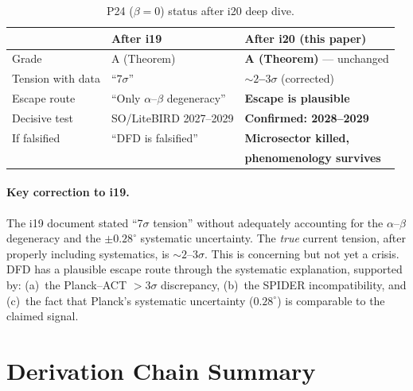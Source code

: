 \documentclass[11pt]{article}
\begin{document}
\begin{table}[h]
\centering
\caption{P24 ($\beta = 0$) status after i20 deep dive.}
\begin{tabular}{lll}
\toprule
& \textbf{After i19} & \textbf{After i20 (this paper)} \\
\midrule
Grade & A (Theorem) & \textbf{A (Theorem)} --- unchanged \\
Tension with data & ``$7\sigma$'' & \textbf{$\sim 2$--$3\sigma$} (corrected) \\
Escape route & ``Only $\alpha$--$\beta$ degeneracy'' & \textbf{Escape is plausible} \\
Decisive test & SO/LiteBIRD 2027--2029 & \textbf{Confirmed: 2028--2029} \\
If falsified & ``DFD is falsified'' & \textbf{Microsector killed,} \\
& & \textbf{phenomenology survives} \\
\bottomrule
\end{tabular}
\end{table}

\paragraph{Key correction to i19.}
The i19 document stated ``7$\sigma$ tension'' without adequately
accounting for the $\alpha$--$\beta$ degeneracy and the
$\pm 0.28^\circ$ systematic uncertainty.  The \emph{true} current
tension, after properly including systematics, is $\sim 2$--$3\sigma$.
This is concerning but not yet a crisis.  DFD has a plausible
escape route through the systematic explanation, supported by:
(a)~the Planck--ACT $>3\sigma$ discrepancy, (b)~the SPIDER
incompatibility, and (c)~the fact that Planck's systematic
uncertainty ($0.28^\circ$) is comparable to the claimed signal.


\section*{Derivation Chain Summary}
\end{document}
